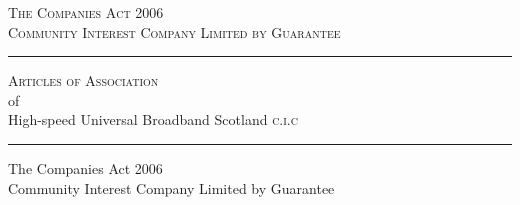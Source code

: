 \documentclass[tocflat]{article}
\newcommand{\companyname}{High-speed Universal Broadband Scotland
  \textsc{c.i.c}}%
\begin{document}
%

\thispagestyle{empty}%
\begin{center}%
  \textsc{The Companies Act 2006}\\
  \vspace{2em}%
  \textsc{Community Interest Company Limited by Guarantee}\\
  \vspace{8em}%
  \hrule
  \vspace{2em}%
  \textsc{Articles of Association}\\
  \vspace{1em}%
  of\\
  \vspace{1em}%
  \companyname\\
  \vspace{2em}%
  \hrule
\end{center}%
\newpage

\begin{center}%
  The Companies Act 2006\\
  Community Interest Company Limited by Guarantee\\
\end{center}%
\vspace{2em}%
\end{document}
